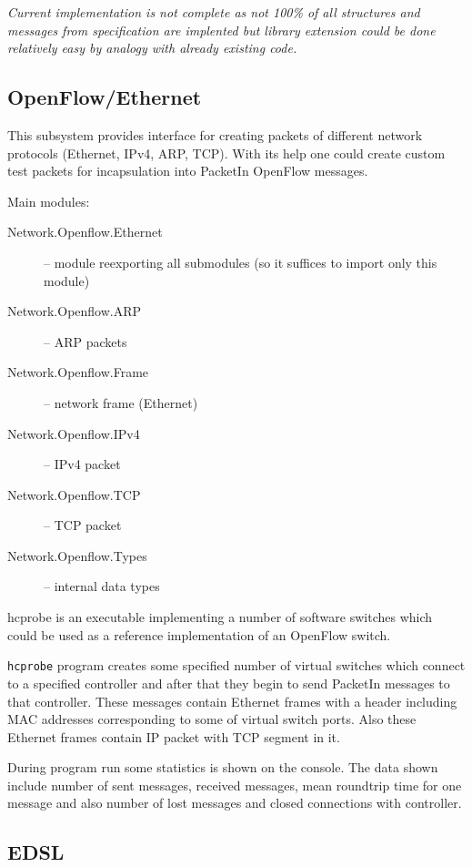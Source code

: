 \documentclass[9pt,a4paper]{article}
\begin{document}
\emph{Current implementation is not complete as not 100\% of all
  structures and messages from specification are implented but library
  extension could be done relatively easy by analogy with already
  existing code.}

\subsection{OpenFlow/Ethernet}

This subsystem provides interface for creating packets of different
network protocols (Ethernet, IPv4, ARP, TCP). With its help one could
create custom test packets for incapsulation into PacketIn OpenFlow
messages.

Main modules:

\begin{description}
  \item[Network.Openflow.Ethernet] -- module reexporting all
    submodules (so it suffices to import only this module)
  \item[Network.Openflow.ARP]      -- ARP packets
  \item[Network.Openflow.Frame]    -- network frame (Ethernet)
  \item[Network.Openflow.IPv4]     -- IPv4 packet
  \item[Network.Openflow.TCP]      -- TCP packet
  \item[Network.Openflow.Types]    -- internal data types
\end{description}

hcprobe is an executable implementing a number of software switches
which could be used as a reference implementation of an OpenFlow
switch.

\texttt{hcprobe} program creates some specified number of virtual
switches which connect to a specified controller and after that they
begin to send PacketIn messages to that controller. These messages
contain Ethernet frames with a header including MAC addresses
corresponding to some of virtual switch ports. Also these Ethernet
frames contain IP packet with TCP segment in it.

During program run some statistics is shown on the console. The data
shown include number of sent messages, received messages, mean
roundtrip time for one message and also number of lost messages and
closed connections with controller.

\subsection{EDSL}
\end{document}
